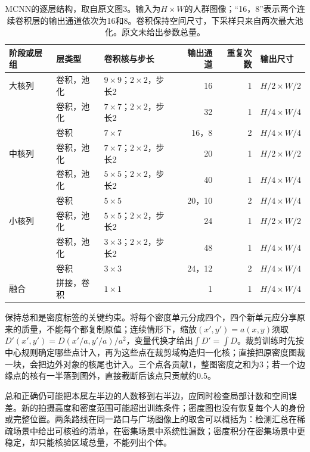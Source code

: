 \begin{table}[tbp]
 \centering
 \small
 \begin{tabular}{@{}lllrrl@{}}
 \toprule
 阶段或层组 & 层类型 & 卷积核与步长 & 输出通道 & 重复次数 & 输出尺寸\\
 \midrule
 大核列 & 卷积，池化 & $9\times9$；$2\times2$，步长2 & 16 & 1 & $H/2\times W/2$\\
        & 卷积，池化 & $7\times7$；$2\times2$，步长2 & 32 & 1 & $H/4\times W/4$\\
        & 卷积 & $7\times7$ & 16，8 & 2 & $H/4\times W/4$\\
 中核列 & 卷积，池化 & $7\times7$；$2\times2$，步长2 & 20 & 1 & $H/2\times W/2$\\
        & 卷积，池化 & $5\times5$；$2\times2$，步长2 & 40 & 1 & $H/4\times W/4$\\
        & 卷积 & $5\times5$ & 20，10 & 2 & $H/4\times W/4$\\
 小核列 & 卷积，池化 & $5\times5$；$2\times2$，步长2 & 24 & 1 & $H/2\times W/2$\\
        & 卷积，池化 & $3\times3$；$2\times2$，步长2 & 48 & 1 & $H/4\times W/4$\\
        & 卷积 & $3\times3$ & 24，12 & 2 & $H/4\times W/4$\\
 融合 & 拼接，卷积 & $1\times1$ & 1 & 1 & $H/4\times W/4$\\
 \bottomrule
 \end{tabular}
 \caption{MCNN的逐层结构，取自原文图3。输入为$H\times W$的人群图像；“16，8”表示两个连续卷积层的输出通道依次为16和8。卷积保持空间尺寸，下采样只来自两次最大池化。原文未给出参数总量。}
 \label{tab:vision-recognition-mcnn-layers}
\end{table}

保持总和是密度标签的关键约束。将每个密度单元分成四个，四个新单元应分享原来的质量，不能每个都复制原值；连续情形下，缩放$(x',y')=a(x,y)$须取$D'(x',y')=D(x'/a,y'/a)/a^2$，变量代换才给出$\int D'=\int D$。裁剪训练时先按中心规则确定哪些点计入，再为这些点在裁剪域构造归一化核；直接把原密度图裁一块，会把边外对象的核尾也计入。三个点各贡献1，整图密度之和为3；若一个边缘点的核有一半落到图外，直接截断后该点只贡献约0.5。

总和正确仍可能把本属左半边的人数移到右半边，应同时检查局部计数和空间误差。新的拍摄高度和密度范围可能超出训练条件；密度图也没有恢复每个人的身份或完整位置。两条路线在同一路口与广场图像上的取舍可以概括为：检测汇总在稀疏场景中给出可核验的清单，在密集场景中系统性漏数；密度积分在密集场景中更稳定，却只能核验区域总量，不能列出个体。

